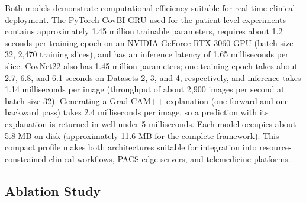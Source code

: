 \documentclass[a4paper,fleqn]{cas-sc}
\begin{document}
\begin{table}[!htbp]  
      \begin{center}
     \caption{Computational complexity of the proposed models on an NVIDIA RTX 3060 (training time per epoch includes augmentation and the validation pass; inference latency at batch size 1, FP32, mean of 5$\times$200 forward passes after warm-up)}
     \label{tab:complexity}
     \small
    \end{center}
\end{table}

Both models demonstrate computational efficiency suitable for real-time clinical deployment. The PyTorch CovBI-GRU used for the patient-level experiments contains approximately 1.45 million trainable parameters, requires about 1.2 seconds per training epoch on an NVIDIA GeForce RTX 3060 GPU (batch size 32, 2,470 training slices), and has an inference latency of 1.65 milliseconds per slice. CovNet22 also has 1.45 million parameters; one training epoch takes about 2.7, 6.8, and 6.1 seconds on Datasets 2, 3, and 4, respectively, and inference takes 1.14 milliseconds per image (throughput of about 2,900 images per second at batch size 32). Generating a Grad-CAM++ explanation (one forward and one backward pass) takes 2.4 milliseconds per image, so a prediction with its explanation is returned in well under 5 milliseconds. Each model occupies about 5.8 MB on disk (approximately 11.6 MB for the complete framework). This compact profile makes both architectures suitable for integration into resource-constrained clinical workflows, PACS edge servers, and telemedicine platforms.

\subsection{Ablation Study}
\end{document}
